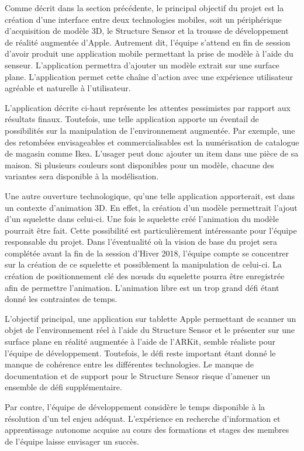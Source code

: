\documentclass[rapport.tex]{subfiles}
\begin{document}
\par
Comme décrit dans la section précédente, le principal objectif du projet est la création d’une interface entre deux technologies mobiles, soit un périphérique d’acquisition de modèle 3D, le Structure Sensor et la trousse de développement de réalité augmentée d’Apple. Autrement dit, l’équipe s’attend en fin de session d’avoir produit une application mobile permettant la prise de modèle à l’aide du senseur. L’application permettra d’ajouter un modèle extrait sur une surface plane. L’application permet cette chaîne d’action avec une expérience utilisateur agréable et naturelle à l’utilisateur.
\par
L’application décrite ci-haut représente les attentes pessimistes par rapport aux résultats finaux. Toutefois, une telle application apporte un éventail de possibilités sur la manipulation de l’environnement augmentée. Par exemple, une des retombées envisageables et commercialisables est la numérisation de catalogue de magasin comme Ikea. L’usager peut donc ajouter un item dans une pièce de sa maison. Si plusieurs couleurs sont disponibles pour un modèle, chacune des variantes sera disponible à la modélisation.
\par
Une autre ouverture technologique, qu’une telle application apporterait, est dans un contexte d’animation 3D. En effet, la création d’un modèle permettrait l’ajout d’un squelette dans celui-ci. Une fois le squelette créé l’animation du modèle pourrait être fait. Cette possibilité est particulièrement intéressante pour l’équipe responsable du projet. Dans l’éventualité où la vision de base du projet sera complétée avant la fin de la session d’Hiver 2018, l’équipe compte se concentrer sur la création de ce squelette et possiblement la manipulation de celui-ci. La création de positionnement clé des nœuds du squelette pourra être enregistrée afin de permettre l’animation. L’animation libre est un trop grand défi étant donné les contraintes de temps.
\par
L’objectif principal, une application sur tablette Apple permettant de scanner un objet de l’environnement réel à l’aide du Structure Sensor et le présenter sur une surface plane en réalité augmentée à l’aide de l’ARKit, semble réaliste pour l’équipe de développement. Toutefois, le défi reste important étant donné le manque de cohérence entre les différentes technologies. Le manque de documentation et de support pour le Structure Sensor risque d’amener un ensemble de défi supplémentaire.
\par
Par contre, l’équipe de développement considère le temps disponible à la résolution d’un tel enjeu adéquat. L’expérience en recherche d’information et apprentissage autonome acquise au cours des formations et stages des membres de l’équipe laisse envisager un succès.
\end{document}

